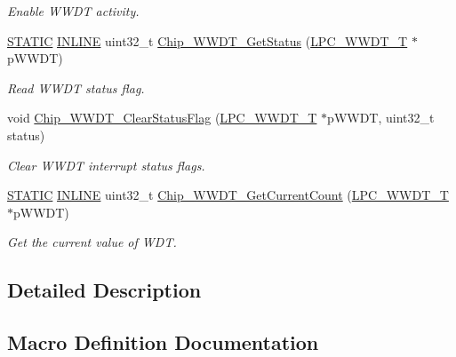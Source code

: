 \begin{DoxyCompactItemize}
\begin{DoxyCompactList}\small\item\em Enable W\+W\+DT activity. \end{DoxyCompactList}\item 
\hyperlink{group___l_p_c___types___public___macros_ga10b2d890d871e1489bb02b7e70d9bdfb}{S\+T\+A\+T\+IC} \hyperlink{spifi__18xx__43xx_8h_a2eb6f9e0395b47b8d5e3eeae4fe0c116}{I\+N\+L\+I\+NE} uint32\+\_\+t \hyperlink{group___w_w_d_t__18_x_x__43_x_x_ga9e5a34151326049c5485bb20c9f36fee}{Chip\+\_\+\+W\+W\+D\+T\+\_\+\+Get\+Status} (\hyperlink{struct_l_p_c___w_w_d_t___t}{L\+P\+C\+\_\+\+W\+W\+D\+T\+\_\+T} $\ast$p\+W\+W\+DT)
\begin{DoxyCompactList}\small\item\em Read W\+W\+DT status flag. \end{DoxyCompactList}\item 
void \hyperlink{group___w_w_d_t__18_x_x__43_x_x_ga6e6453450170638f554e7ba3c548ec4a}{Chip\+\_\+\+W\+W\+D\+T\+\_\+\+Clear\+Status\+Flag} (\hyperlink{struct_l_p_c___w_w_d_t___t}{L\+P\+C\+\_\+\+W\+W\+D\+T\+\_\+T} $\ast$p\+W\+W\+DT, uint32\+\_\+t status)
\begin{DoxyCompactList}\small\item\em Clear W\+W\+DT interrupt status flags. \end{DoxyCompactList}\item 
\hyperlink{group___l_p_c___types___public___macros_ga10b2d890d871e1489bb02b7e70d9bdfb}{S\+T\+A\+T\+IC} \hyperlink{spifi__18xx__43xx_8h_a2eb6f9e0395b47b8d5e3eeae4fe0c116}{I\+N\+L\+I\+NE} uint32\+\_\+t \hyperlink{group___w_w_d_t__18_x_x__43_x_x_ga4b1c8d2f48a8397d63c1c3c74dc7e82a}{Chip\+\_\+\+W\+W\+D\+T\+\_\+\+Get\+Current\+Count} (\hyperlink{struct_l_p_c___w_w_d_t___t}{L\+P\+C\+\_\+\+W\+W\+D\+T\+\_\+T} $\ast$p\+W\+W\+DT)
\begin{DoxyCompactList}\small\item\em Get the current value of W\+DT. \end{DoxyCompactList}\end{DoxyCompactItemize}


\subsection{Detailed Description}


\subsection{Macro Definition Documentation}
\mbox{\label{group___w_w_d_t__18_x_x__43_x_x_gafd5360b2cfcfe4271a608b6c90bcea5f}} 
